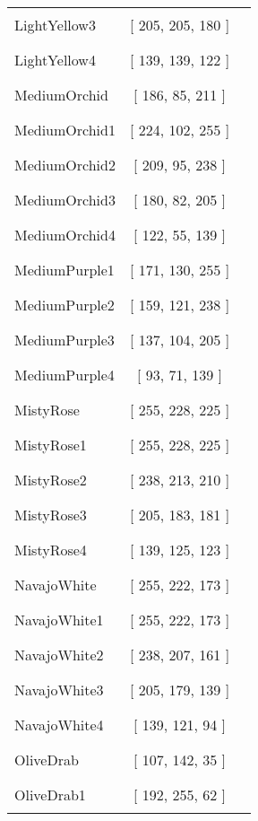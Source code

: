 \begin{tabular}{|l|c|c|}
LightYellow3 & [ 205, 205, 180 ] & \color{LightYellow3} \rule{1cm}{1.5ex}\\
LightYellow4 & [ 139, 139, 122 ] & \color{LightYellow4} \rule{1cm}{1.5ex}\\
MediumOrchid & [ 186, 85, 211 ] & \color{MediumOrchid} \rule{1cm}{1.5ex}\\
MediumOrchid1 & [ 224, 102, 255 ] & \color{MediumOrchid1} \rule{1cm}{1.5ex}\\
MediumOrchid2 & [ 209, 95, 238 ] & \color{MediumOrchid2} \rule{1cm}{1.5ex}\\
MediumOrchid3 & [ 180, 82, 205 ] & \color{MediumOrchid3} \rule{1cm}{1.5ex}\\
MediumOrchid4 & [ 122, 55, 139 ] & \color{MediumOrchid4} \rule{1cm}{1.5ex}\\
MediumPurple1 & [ 171, 130, 255 ] & \color{MediumPurple1} \rule{1cm}{1.5ex}\\
MediumPurple2 & [ 159, 121, 238 ] & \color{MediumPurple2} \rule{1cm}{1.5ex}\\
MediumPurple3 & [ 137, 104, 205 ] & \color{MediumPurple3} \rule{1cm}{1.5ex}\\
MediumPurple4 & [ 93, 71, 139 ] & \color{MediumPurple4} \rule{1cm}{1.5ex}\\
MistyRose & [ 255, 228, 225 ] & \color{MistyRose} \rule{1cm}{1.5ex}\\
MistyRose1 & [ 255, 228, 225 ] & \color{MistyRose1} \rule{1cm}{1.5ex}\\
MistyRose2 & [ 238, 213, 210 ] & \color{MistyRose2} \rule{1cm}{1.5ex}\\
MistyRose3 & [ 205, 183, 181 ] & \color{MistyRose3} \rule{1cm}{1.5ex}\\
MistyRose4 & [ 139, 125, 123 ] & \color{MistyRose4} \rule{1cm}{1.5ex}\\
NavajoWhite & [ 255, 222, 173 ] & \color{NavajoWhite} \rule{1cm}{1.5ex}\\
NavajoWhite1 & [ 255, 222, 173 ] & \color{NavajoWhite1} \rule{1cm}{1.5ex}\\
NavajoWhite2 & [ 238, 207, 161 ] & \color{NavajoWhite2} \rule{1cm}{1.5ex}\\
NavajoWhite3 & [ 205, 179, 139 ] & \color{NavajoWhite3} \rule{1cm}{1.5ex}\\
NavajoWhite4 & [ 139, 121, 94 ] & \color{NavajoWhite4} \rule{1cm}{1.5ex}\\
OliveDrab & [ 107, 142, 35 ] & \color{OliveDrab} \rule{1cm}{1.5ex}\\
OliveDrab1 & [ 192, 255, 62 ] & \color{OliveDrab1} \rule{1cm}{1.5ex}\\

\end{tabular}
